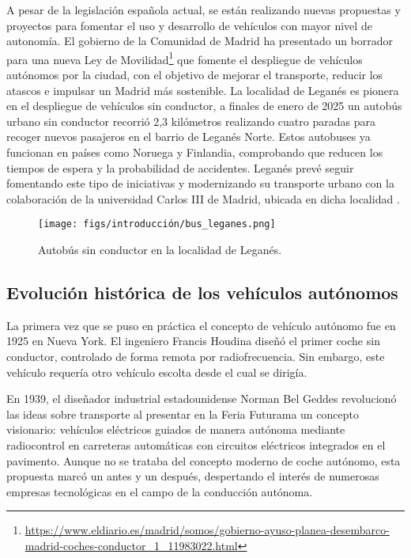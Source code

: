 A pesar de la legislación española actual, se están realizando nuevas propuestas y proyectos para fomentar el uso y desarrollo de vehículos con mayor nivel de autonomía. El gobierno de la Comunidad de Madrid ha presentado un borrador para una nueva Ley de Movilidad\footnote{\url{https://www.eldiario.es/madrid/somos/gobierno-ayuso-planea-desembarco-madrid-coches-conductor_1_11983022.html}} que fomente el despliegue de vehículos autónomos por la ciudad, con el objetivo de mejorar el transporte, reducir los atascos e impulsar un Madrid más sostenible. La localidad de Leganés es pionera en el despliegue de vehículos sin conductor, a finales de enero de 2025 un autobús urbano sin conductor recorrió 2,3 kilómetros realizando cuatro paradas para recoger nuevos pasajeros en el barrio de Leganés Norte. Estos autobuses ya funcionan en países como Noruega y Finlandia, comprobando que reducen los tiempos de espera y la probabilidad de accidentes. Leganés prevé seguir fomentando este tipo de iniciativas y modernizando su transporte urbano con la colaboración de la universidad Carlos III de Madrid, ubicada en dicha localidad \cite{leganes}.
\begin{figure} [ht]
\begin{center}
\texttt{[image: figs/introducción/bus\_leganes.png]}
\end{center}
\caption{Autobús sin conductor en la localidad de Leganés.}
\label{fig:leganes-photo}
\end{figure}

\subsection{Evolución histórica de los vehículos autónomos}
\label{sec:historia}

La primera vez que se puso en práctica el concepto de vehículo autónomo fue en 1925 en Nueva York. El ingeniero Francis Houdina diseñó el primer coche sin conductor, controlado de forma remota por radiofrecuencia. Sin embargo, este vehículo requería otro vehículo escolta desde el cual se dirigía.

En 1939, el diseñador industrial estadounidense Norman Bel Geddes revolucionó las ideas sobre transporte al presentar en la Feria Futurama un concepto visionario: vehículos eléctricos guiados de manera autónoma mediante radiocontrol en carreteras automáticas con circuitos eléctricos integrados en el pavimento. Aunque no se trataba del concepto moderno de coche autónomo, esta propuesta marcó un antes y un después, despertando el interés de numerosas empresas tecnológicas en el campo de la conducción autónoma.

